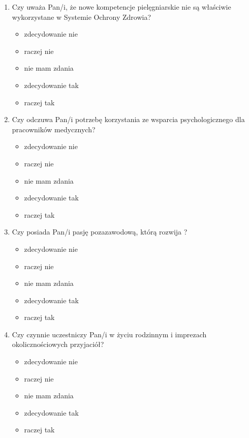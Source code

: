 \documentclass[a4paper,12pt,twoside,openright]{mwrep}
\begin{document}
\begin{appendices}
\begin{enumerate}[label=\arabic*)]
			\item{Czy uważa Pan/i, że nowe kompetencje pielęgniarskie nie są właściwie wykorzystane w Systemie Ochrony Zdrowia?}
		\begin{itemize}
			\item{zdecydowanie nie}
			\item{raczej nie}
			\item{nie mam zdania}
			\item{zdecydowanie tak}
			\item{raczej tak}
		\end{itemize}
		\vspace{\baselineskip}
		
			\item{ Czy odczuwa Pan/i potrzebę korzystania ze wsparcia psychologicznego dla pracowników medycznych?}
		\begin{itemize}
			\item{zdecydowanie nie}
			\item{raczej nie}
			\item{nie mam zdania}
			\item{zdecydowanie tak}
			\item{raczej tak}
		\end{itemize}
		\vspace{\baselineskip}
		
			\item{ Czy posiada Pan/i pasję pozazawodową, którą rozwija ?}
		\begin{itemize}
			\item{zdecydowanie nie}
			\item{raczej nie}
			\item{nie mam zdania}
			\item{zdecydowanie tak}
			\item{raczej tak}
		\end{itemize}
		\vspace{\baselineskip}
		
			\item{Czy czynnie uczestniczy Pan/i w życiu rodzinnym i imprezach okolicznościowych przyjaciół?}
		\begin{itemize}
			\item{zdecydowanie nie}
			\item{raczej nie}
			\item{nie mam zdania}
			\item{zdecydowanie tak}
			\item{raczej tak}
		\end{itemize}
		\vspace{\baselineskip}
		

\end{enumerate}
\end{appendices}
\end{document}
